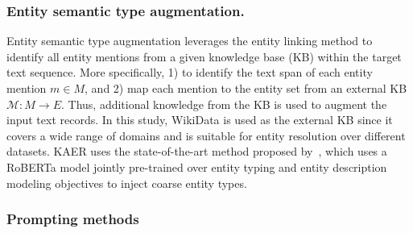





\subsubsection{Entity semantic type augmentation.}
Entity semantic type augmentation leverages the entity linking method to identify all entity mentions from a given knowledge base (KB) within the target text sequence. 
More specifically, 1) to identify the text span of each entity mention $m \in M$, and 2) map each mention to the entity set from an external KB $\mathcal{M}: M \rightarrow E$. 
Thus, additional knowledge from the KB is used to augment the input text records.
In this study, WikiData is used as the external KB since it covers a wide range of domains and is suitable for entity resolution over different datasets. 
KAER uses the state-of-the-art method proposed by~\citet{ayoola_refined_2022}, which uses a RoBERTa model jointly pre-trained over entity typing and entity description modeling objectives to inject coarse entity types. %

\subsubsection{Prompting methods}
